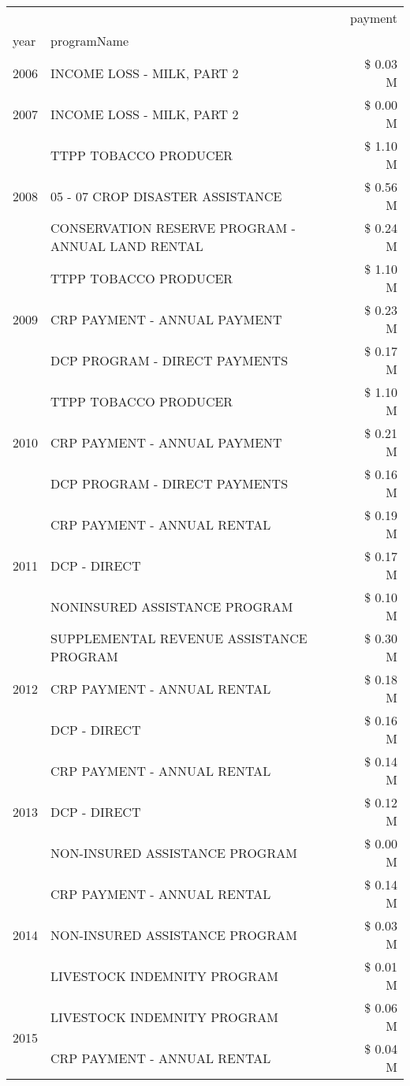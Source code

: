 \begin{tabular}{llr}
\toprule
 &  & payment \\
year & programName &  \\
\midrule
2006 & INCOME LOSS - MILK, PART 2 & \$ 0.03 M \\
\cline{1-3}
2007 & INCOME LOSS - MILK, PART 2 & \$ 0.00 M \\
\cline{1-3}
\multirow[t]{3}{*}{2008} & TTPP TOBACCO PRODUCER & \$ 1.10 M \\
 & 05 - 07 CROP DISASTER ASSISTANCE & \$ 0.56 M \\
 & CONSERVATION RESERVE PROGRAM - ANNUAL LAND RENTAL & \$ 0.24 M \\
\cline{1-3}
\multirow[t]{3}{*}{2009} & TTPP TOBACCO PRODUCER & \$ 1.10 M \\
 & CRP PAYMENT - ANNUAL PAYMENT & \$ 0.23 M \\
 & DCP PROGRAM - DIRECT PAYMENTS & \$ 0.17 M \\
\cline{1-3}
\multirow[t]{3}{*}{2010} & TTPP TOBACCO PRODUCER & \$ 1.10 M \\
 & CRP PAYMENT - ANNUAL PAYMENT & \$ 0.21 M \\
 & DCP PROGRAM - DIRECT PAYMENTS & \$ 0.16 M \\
\cline{1-3}
\multirow[t]{3}{*}{2011} & CRP PAYMENT - ANNUAL RENTAL & \$ 0.19 M \\
 & DCP - DIRECT & \$ 0.17 M \\
 & NONINSURED ASSISTANCE PROGRAM & \$ 0.10 M \\
\cline{1-3}
\multirow[t]{3}{*}{2012} & SUPPLEMENTAL REVENUE ASSISTANCE PROGRAM & \$ 0.30 M \\
 & CRP PAYMENT - ANNUAL RENTAL & \$ 0.18 M \\
 & DCP - DIRECT & \$ 0.16 M \\
\cline{1-3}
\multirow[t]{3}{*}{2013} & CRP PAYMENT - ANNUAL RENTAL & \$ 0.14 M \\
 & DCP - DIRECT & \$ 0.12 M \\
 & NON-INSURED ASSISTANCE PROGRAM & \$ 0.00 M \\
\cline{1-3}
\multirow[t]{3}{*}{2014} & CRP PAYMENT - ANNUAL RENTAL & \$ 0.14 M \\
 & NON-INSURED ASSISTANCE PROGRAM & \$ 0.03 M \\
 & LIVESTOCK INDEMNITY PROGRAM & \$ 0.01 M \\
\cline{1-3}
\multirow[t]{3}{*}{2015} & LIVESTOCK INDEMNITY PROGRAM & \$ 0.06 M \\
 & CRP PAYMENT - ANNUAL RENTAL & \$ 0.04 M \\

\end{tabular}
